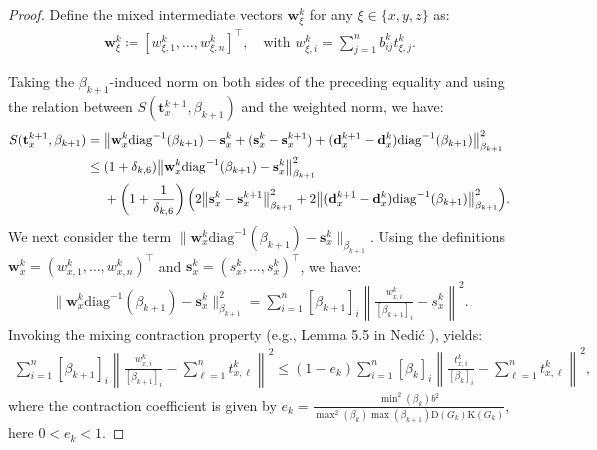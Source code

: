 \documentclass{article}
\theoremstyle{plain}
\theoremstyle{definition}
\theoremstyle{remark}
\begin{document}
\begin{proof}
Define the mixed intermediate vectors $\mathbf{w}_{\xi}^k$ for any $\xi \in \{x, y, z\}$ as:
\begin{align*}
    \mathbf{w}_{\xi}^k \coloneqq [w_{\xi,1}^{k}, \ldots, w_{\xi,n}^{k}]^\top, \quad \text{with } w_{\xi,i}^{k} = \sum_{j=1}^n b_{ij}^{k} t_{\xi,j}^k.
\end{align*}

Taking the $\beta_{k+1}$-induced norm on both sides of the preceding equality and using the relation between $S(\mathbf{t}_{x}^{k+1}, \beta_{k+1})$ and the weighted norm, we have:
\begin{align}\label{eq:S_recurrence_step1}
    S(\mathbf{t}_{x}^{k+1},\beta_{k+1}) ={}& \big\|\mathbf{w}_{x}^k\mathrm{diag}^{-1}(\beta_{k+1})-\mathbf{s}_{x}^k+(\mathbf{s}_{x}^k-\mathbf{s}_{x}^{k+1})+(\mathbf{d}_{x}^{k+1}-\mathbf{d}_{x}^k)\mathrm{diag}^{-1}(\beta_{k+1})\big\|_{\beta_{k+1}}^{2} \notag \\
    \leq{}& (1+\delta_{k,6})\big\|\mathbf{w}_{x}^{k}\mathrm{diag}^{-1}(\beta_{k+1})-\mathbf{s}_{x}^{k}\big\|_{\beta_{k+1}}^{2} \notag \\
    &+\left(1+\frac{1}{\delta_{k,6}}\right)\Big(2\big\|\mathbf{s}_{x}^{k}-\mathbf{s}_{x}^{k+1}\big\|_{\beta_{k+1}}^{2}
    +2\big\|(\mathbf{d}_{x}^{k+1}-\mathbf{d}_{x}^k)\mathrm{diag}^{-1}(\beta_{k+1})\big\|_{\beta_{k+1}}^{2}\Big).
\end{align}
We next consider the term $\|\mathbf{w}_{x}^{k}\mathrm{diag}^{-1}(\beta_{k+1})-\mathbf{s}_{x}^{k}\|_{\beta_{k+1}}$. Using the definitions $\mathbf{w}_{x}^k=(w_{x,1}^{k},\ldots, w_{x,n}^{k})^\top$ and $\mathbf{s}_{x}^{k}=(s_{x}^{k},\ldots,s_{x}^{k})^\top$, we have:
\begin{align*}
    \|\mathbf{w}_{x}^k\mathrm{diag}^{-1}(\beta_{k+1})-\mathbf{s}_{x}^k\|_{\beta_{k+1}}^{2} = \sum_{i=1}^n[\beta_{k+1}]_i\left\|\frac{w_{x,i}^k}{[\beta_{k+1}]_i}-s_{x}^k\right\|^2.
\end{align*}
Invoking the mixing contraction property (e.g., Lemma 5.5 in Nedić ), yields:
\begin{align*}
    \sum_{i=1}^n[\beta_{k+1}]_i\left\|\frac{w_{x,i}^k}{[\beta_{k+1}]_i}-\sum_{\ell=1}^n t_{x,\ell}^k\right\|^2 \leq (1-e_k) \sum_{i=1}^n[\beta_k]_i\left\|\frac{t_{x,i}^k}{[\beta_k]_i}-\sum_{\ell=1}^n t_{x,\ell}^k\right\|^2,
\end{align*}
where the contraction coefficient is given by $e_{k} = \frac{\min^{2}(\beta_{k}) b^{2}}{\max^{2}(\beta_{k})\max(\beta_{k+1}) \mathrm{D}(G_{k})\mathrm{K}(G_{k})}$, here $0<e_{k}<1$.

\end{proof}
\end{document}
